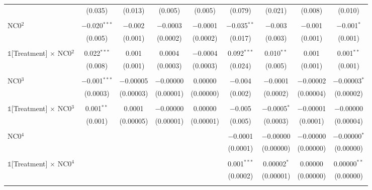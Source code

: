 {\begin{table}[t!]
\begin{adjustbox}{scale = 0.9}
\begin{threeparttable}
\begin{tabular}{@{\extracolsep{3pt}}lcccccccc}
                    & (0.035) & (0.013) & (0.005) & (0.005) & (0.079) & (0.021) & (0.008) & (0.010) \\ 
                    & & & & & & & & \\ 
                    NC0$^{2}$ & $-$0.020$^{***}$ & $-$0.002 & $-$0.0003 & $-$0.0001 & $-$0.035$^{**}$ & $-$0.003 & $-$0.001 & $-$0.001$^{*}$ \\ 
                    & (0.005) & (0.001) & (0.0002) & (0.0002) & (0.017) & (0.003) & (0.001) & (0.001) \\ 
                    & & & & & & & & \\ 
                    $\mathbb{1}$[Treatment] $\times$ NC0$^{2}$ & 0.022$^{***}$ & 0.001 & 0.0004 & $-$0.0004 & 0.092$^{***}$ & 0.010$^{**}$ & 0.001 & 0.001$^{**}$ \\ 
                    & (0.008) & (0.001) & (0.0003) & (0.0003) & (0.024) & (0.005) & (0.001) & (0.001) \\ 
                    & & & & & & & & \\ 
                    NC0$^{3}$ & $-$0.001$^{***}$ & $-$0.00005 & $-$0.00000 & 0.00000 & $-$0.004 & $-$0.0001 & $-$0.00002 & $-$0.00003$^{*}$ \\ 
                    & (0.0003) & (0.00003) & (0.00001) & (0.00000) & (0.002) & (0.0002) & (0.00004) & (0.00002) \\ 
                    & & & & & & & & \\ 
                    $\mathbb{1}$[Treatment] $\times$ NC0$^{3}$ & 0.001$^{**}$ & 0.0001 & $-$0.00000 & 0.00000 & $-$0.005 & $-$0.0005$^{*}$ & $-$0.00001 & $-$0.00000 \\ 
                    & (0.001) & (0.00005) & (0.00001) & (0.00001) & (0.005) & (0.0003) & (0.0001) & (0.00004) \\ 
                    & & & & & & & & \\ 
                    NC0$^{4}$ &  &  &  &  & $-$0.0001 & $-$0.00000 & $-$0.00000 & $-$0.00000$^{*}$ \\ 
                    &  &  &  &  & (0.0001) & (0.00000) & (0.00000) & (0.00000) \\ 
                    & & & & & & & & \\ 
                    $\mathbb{1}$[Treatment] $\times$ NC0$^{4}$ &  &  &  &  & 0.001$^{***}$ & 0.00002$^{*}$ & 0.00000 & 0.00000$^{**}$ \\ 
                    &  &  &  &  & (0.0002) & (0.00001) & (0.00000) & (0.00000) \\ 
                    & & & & & & & & \\ 

\end{tabular}
\end{threeparttable}
\end{adjustbox}
\end{table}}
